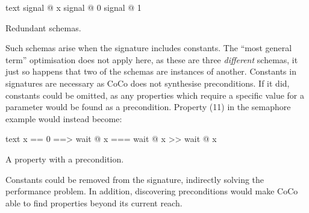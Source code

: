 \begin{listing}
\centering
\begin{cminted}{text}
signal @ x
signal @ 0
signal @ 1
\end{cminted}
\caption{Redundant schemas.}\label{lst:redundant}
\end{listing}

Such schemas arise when the signature includes constants.  The ``most
general term'' optimisation does not apply here, as these are three
\emph{different} schemas, it just so happens that two of the schemas
are instances of another.  Constants in signatures are necessary as
CoCo does not synthesise preconditions.  If it did, constants could be
omitted, as any properties which require a specific value for a
parameter would be found as a precondition.  Property (11) in the
semaphore example would instead become:

\begin{listing}
\centering
\begin{cminted}{text}
x == 0  ==>  wait @ x  ===  wait @ x >> wait @ x
\end{cminted}
\caption{A property with a precondition.}\label{lst:precondition}
\end{listing}

Constants could be removed from the signature, indirectly solving the
performance problem.  In addition, discovering preconditions would
make CoCo able to find properties beyond its current reach.


